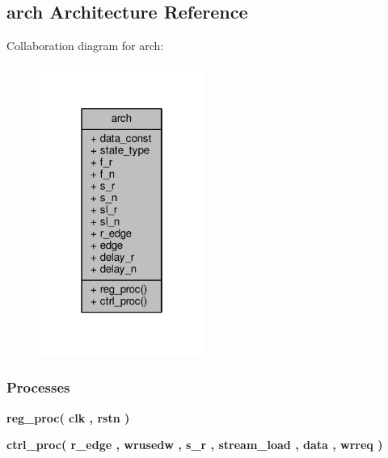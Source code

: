 \subsection{arch Architecture Reference}
\label{classsl__ctrl_1_1arch}


Collaboration diagram for arch\+:\nopagebreak
\begin{figure}[H]
\begin{center}
\leavevmode
\includegraphics[width=154pt]{dd/d64/classsl__ctrl_1_1arch__coll__graph}
\end{center}
\end{figure}
\subsubsection*{Processes}
 \begin{DoxyCompactItemize}
\item 
{\bf reg\+\_\+proc}{\bfseries  ( {\bfseries {\bfseries {\bf clk}} \textcolor{vhdlchar}{ }} , {\bfseries {\bfseries {\bf rstn}} \textcolor{vhdlchar}{ }} )}
\item 
{\bf ctrl\+\_\+proc}{\bfseries  ( {\bfseries {\bfseries {\bf r\+\_\+edge}} \textcolor{vhdlchar}{ }} , {\bfseries {\bfseries {\bf wrusedw}} \textcolor{vhdlchar}{ }} , {\bfseries {\bfseries {\bf s\+\_\+r}} \textcolor{vhdlchar}{ }} , {\bfseries {\bfseries {\bf stream\+\_\+load}} \textcolor{vhdlchar}{ }} , {\bfseries {\bfseries {\bf data}} \textcolor{vhdlchar}{ }} , {\bfseries {\bfseries {\bf wrreq}} \textcolor{vhdlchar}{ }} )}
\end{DoxyCompactItemize}
